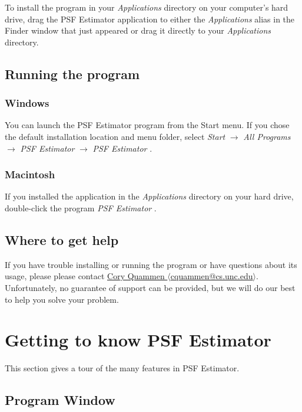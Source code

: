 \documentclass[11pt,titlepage,twoside]{article}
\begin{document}
To install the program in your \emph{Applications} directory on your computer's hard drive, drag the PSF Estimator \ProgramVersion application to either the \emph{Applications} alias in the Finder window that just appeared or drag it directly to your \emph{Applications} directory.

\subsection{Running the program}

\subsubsection{Windows}

You can launch the PSF Estimator program from the Start menu. If you chose the default installation location and menu folder, select \emph{Start} $\rightarrow$ \emph{All Programs} $\rightarrow$ \emph{PSF Estimator \ProgramVersionNoSpace} $\rightarrow$ \emph{PSF Estimator \ProgramVersionNoSpace}.

\subsubsection{Macintosh}

If you installed the application in the \emph{Applications} directory on your hard drive, double-click the program \emph{PSF Estimator \ProgramVersionNoSpace}.

\subsection{Where to get help}

If you have trouble installing or running the program or have questions about its usage, please please contact  \href{mailto:cquammen@cs.unc.edu}{Cory Quammen $\langle$cquammen@cs.unc.edu$\rangle$}. Unfortunately, no guarantee of support can be provided, but we will do our best to help you solve your problem.

\section{Getting to know PSF Estimator}

This section gives a tour of the many features in PSF Estimator.

\subsection{Program Window}
\end{document}
